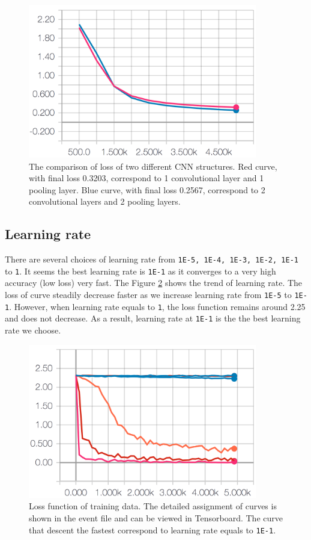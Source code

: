 \documentclass[11pt]{article}
\begin{document}
\begin{figure}[!htb]
   \centering
   \includegraphics[width=10cm]{images/structure.png} %
   \caption{The comparison of loss of two different CNN structures. Red curve, with final loss 0.3203, correspond to 1 convolutional layer and 1 pooling layer. Blue curve, with final loss 0.2567, correspond to 2 convolutional layers and 2 pooling layers.}
   \label{fig:structure}
\end{figure}

\clearpage

\subsection{Learning rate}
There are several choices of learning rate from {\tt 1E-5, 1E-4, 1E-3, 1E-2, 1E-1} to {\tt 1}. It seems the best learning rate is {\tt 1E-1} as it converges to a very high accuracy (low loss) very fast. The Figure \ref{fig:lr} shows the trend of learning rate. The loss of curve steadily decrease faster as we increase learning rate from {\tt 1E-5} to {\tt 1E-1}. However, when learning rate equals to {\tt 1}, the loss function remains around 2.25 and does not decrease. As a result, learning rate at {\tt 1E-1} is the the best learning rate we choose.




\begin{figure}[!htb]
   \centering
   \includegraphics[width=10cm]{images/learning_rate.png} %
   \caption{Loss function of training data. The detailed assignment of curves is shown in the event file and can be viewed in Tensorboard. The curve that descent the fastest correspond to learning rate equals to {\tt 1E-1}.}
   \label{fig:lr}
\end{figure}
\end{document}
